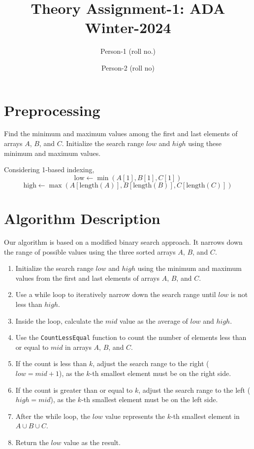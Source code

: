 \documentclass{article}
\title{Theory Assignment-1: ADA Winter-2024}
\author{Person-1 (roll no.) \and Person-2 (roll no)}
\date{}
\begin{document}
\maketitle

\section{Preprocessing}
Find the minimum and maximum values among the first and last elements of arrays \(A\), \(B\), and \(C\). Initialize the search range \(low\) and \(high\) using these minimum and maximum values.

Considering 1-based indexing,
\[
\text{{low}} \leftarrow \min(A[1], B[1], C[1])
\]
\[
\text{{high}} \leftarrow \max(A[\text{{length}}(A)], B[\text{{length}}(B)], C[\text{{length}}(C)])
\]



\section{Algorithm Description}
Our algorithm is based on a modified binary search approach. It narrows down the range of possible values using the three sorted arrays \(A\), \(B\), and \(C\).
\begin{enumerate}
    \item Initialize the search range \(low\) and \(high\) using the minimum and maximum values from the first and last elements of arrays \(A\), \(B\), and \(C\).
    \item Use a while loop to iteratively narrow down the search range until \(low\) is not less than \(high\).
    \item Inside the loop, calculate the \(mid\) value as the average of \(low\) and \(high\).
    \item Use the \texttt{CountLessEqual} function to count the number of elements less than or equal to \(mid\) in arrays \(A\), \(B\), and \(C\).
    \item If the count is less than \(k\), adjust the search range to the right (\(low = mid + 1\)), as the \(k\)-th smallest element must be on the right side.
    \item If the count is greater than or equal to \(k\), adjust the search range to the left (\(high = mid\)), as the \(k\)-th smallest element must be on the left side.
    \item After the while loop, the \(low\) value represents the \(k\)-th smallest element in \(A \cup B \cup C\).
    \item Return the \(low\) value as the result.
\end{enumerate}
\end{document}
